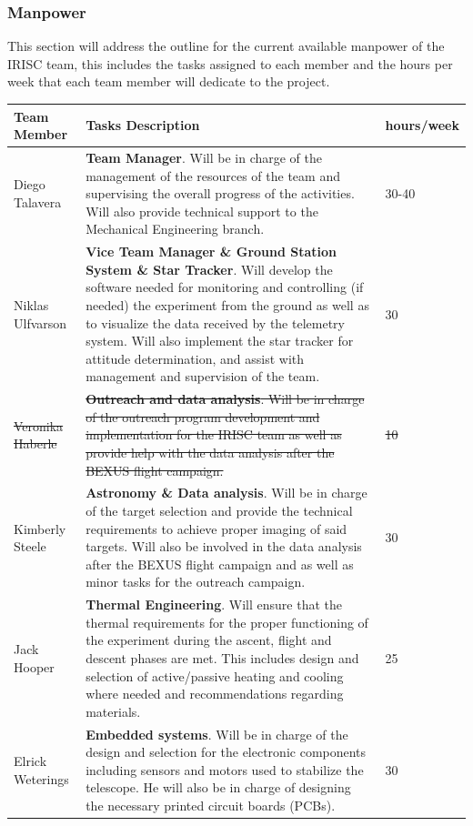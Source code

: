 \subsubsection{Manpower}

This section will address the outline for the current available manpower of the IRISC team, this includes the tasks assigned to each member and the hours per week that each team member will dedicate to the project.

\begin{longtable}{m{} | m{} | m{}}
	\textbf{Team Member} & \textbf{Tasks Description} & \textbf{hours/week} \\ \hline
	Diego Talavera  & \textbf{Team Manager}. Will be in charge of the management of the resources of the team and supervising the overall progress of the activities. Will also provide technical support to the Mechanical Engineering branch. &  30-40 \\ \hline
	Niklas Ulfvarson & \textbf{ Vice Team Manager \& Ground Station System \& Star Tracker}. Will develop the software needed for monitoring and controlling (if needed) the experiment from the ground as well as to visualize the data received by the telemetry system. Will also implement the star tracker for attitude determination, and assist with management and supervision of the team. & 30 \\ \hline
	\st{Veronika Haberle} & \st{\textbf{Outreach and data analysis}. Will be in charge of the outreach program development and implementation for the IRISC team as well as provide help with the data analysis after the BEXUS flight campaign. }& \st{10} \\ \hline
	Kimberly Steele & \textbf{Astronomy \& Data analysis}. Will be in charge of the target selection and provide the technical requirements to achieve proper imaging of said targets. Will also be involved in the data analysis after the BEXUS flight campaign and as well as minor tasks for the outreach campaign. & 30 \\ \hline
	Jack Hooper & \textbf{Thermal Engineering}. Will ensure that the thermal requirements for the proper functioning of the experiment during the ascent, flight and descent phases are met. This includes design and selection of active/passive heating and cooling where needed and recommendations regarding materials. & 25 \\ \hline
	Elrick Weterings & \textbf{Embedded systems}. Will be in charge of the design and selection for the electronic components including sensors and motors used to stabilize the telescope. He will also be in charge of designing the necessary printed circuit boards (PCBs). & 30 \\ \hline

\end{longtable}
